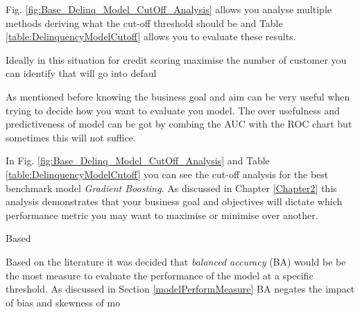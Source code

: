 Fig. \ref{fig:Base_Delinq_Model_CutOff_Analysis} allows you analyse multiple methods deriving what the cut-off threshold should be and Table \ref{table:DelinquencyModelCutoff} allows you to evaluate these results.

Ideally in this situation for credit scoring maximise the number of customer you can identify that will go into defaul 

As mentioned before knowing the business goal and aim can be very useful when trying to decide how you want to evaluate you model. The over usefulness and predictiveness of model can be got by combing the AUC with the ROC chart but sometimes this will not suffice. 

In Fig. \ref{fig:Base_Delinq_Model_CutOff_Analysis} and Table \ref{table:DelinquencyModelCutoff} you can see the cut-off analysis for the best benchmark model \textit{Gradient Boosting}. As discussed in Chapter \ref{Chapter2} this analysis demonstrates that your business goal and objectives will dictate which performance metric you may want to maximise or minimise over another. 

Based 

Based on the literature it was decided that \textit{balanced accuracy} (BA) would be be the most measure to evaluate the performance of the model at a specific threshold. As discussed in Section \ref{modelPerformMeasure} BA negates the impact of bias and skewness of mo